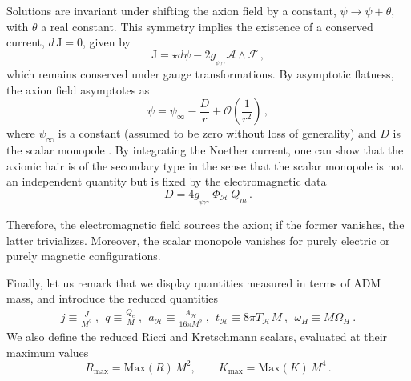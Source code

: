 \documentclass[11pt]{article}
\numberwithin{equation}{section} %
\begin{document}
Solutions are invariant under shifting the axion field by a constant, $\psi\rightarrow \psi + \theta$, with $\theta$ a real constant. This symmetry implies the existence of a conserved current, $d\, \mathrm{J} =0$, given by \cite{Rakhmanov:1993yd}
%
\begin{equation}
   \mathrm{J}= \star d \psi-2g_{_{\psi\gamma\gamma}}\mathcal{A}\land\mathcal{F}\, ,
\end{equation}
which remains conserved under gauge transformations.  By asymptotic flatness, the axion field asymptotes as 
%
\begin{equation}
\psi=\psi_{\infty}-\frac{D}{r}+\mathcal{O}\left(\frac{1}{r^2}\right)\,,
\end{equation}
%
where  $\psi_{\infty}$ is a constant (assumed to be zero without loss of generality) and $D$ is the scalar monopole
\cite{Prabhu:2018aun,Pacilio:2018kdk}. By   {integrating}  the Noether current, one can show that the axionic hair is of the secondary type   {in the sense that the scalar monopole is not an independent quantity but is fixed by the electromagnetic data \cite{Coleman:1991ku,Prabhu:2018aun,Pacilio:2018kdk,Ballesteros:2023iqb,HerdeiroRadu2015}}
\begin{equation}
\label{scalarcharge}
   D= 4g_{_{\psi\gamma\gamma}}\ \Phi_{\mathcal{H}}\,Q_m\,.
\end{equation}

Therefore, the electromagnetic field   {sources}  the axion; if the former vanishes, the latter trivializes.
  {Moreover}, the scalar   {monopole vanishes for}  purely electric or purely magnetic configurations.




\medskip

Finally,  
let us remark that we display quantities measured in 
terms of ADM mass,
and
introduce the reduced quantities
\begin{eqnarray}
\label{scale1}
j\equiv \frac{J}{M^2}\ ,~~
q\equiv \frac{Q_e}{M}\ , ~~
a_{\mathcal{H}}\equiv \frac{A_{\mathcal{H}}}{16\pi M^2}\ , ~~
t_{\mathcal{H}}\equiv 8\pi T_{\mathcal{H}} M \ ,~~
\omega_H \equiv M \Omega_H~.
\end{eqnarray}
We also define the reduced Ricci and Kretschmann scalars, evaluated at their maximum values
\begin{equation}
    R_{\text{max}}=\text{Max}(R)\, M^2,\qquad K_{\text{max}}=\text{Max}(K)\,M^4\,.
\end{equation}

\end{document}
